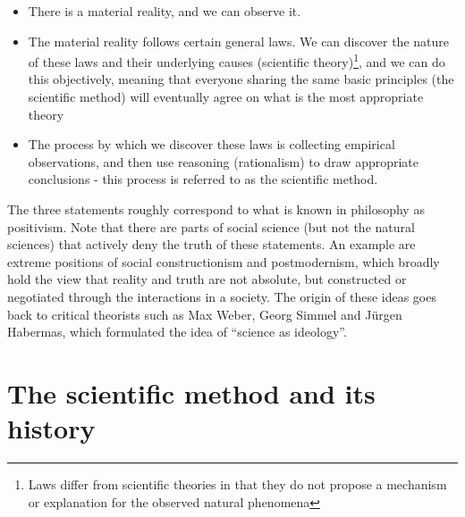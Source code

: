 \documentclass{tufte-book}
\begin{document}
\begin{itemize}
\item There is a material reality, and we can observe it.
\item The material reality follows certain general laws. We can discover the nature of these laws and their underlying causes (scientific theory)\footnote{Laws differ from scientific theories in that they do not propose a mechanism or explanation for the observed natural phenomena}, and we can do this objectively, meaning that everyone sharing the same basic principles (the scientific method) will eventually agree on what is the most appropriate theory
\item The process by which we discover these laws is collecting empirical observations, and then use reasoning (rationalism) to draw appropriate conclusions - this process is referred to as the scientific method. 
\end{itemize}

The three statements roughly correspond to what is known in philosophy as positivism. Note that there are parts of social science (but not the natural sciences) that actively deny the truth of these statements. An example are extreme positions of social constructionism and postmodernism, which broadly hold the view that reality and truth are not absolute, but constructed or negotiated through the interactions in a society. The origin of these ideas goes back to critical theorists such as Max Weber, Georg Simmel and Jürgen Habermas, which formulated the idea of ``science as ideology''.



\section{The scientific method and its history}\label{sec: scientific method}

\end{document}
